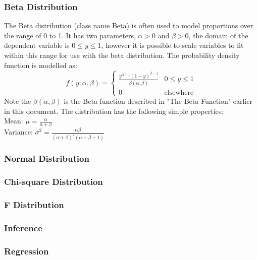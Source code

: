 \documentclass[a4paper]{article}
\begin{document}
\subsubsection*{Beta Distribution}
The Beta distribution (class name Beta) is often used to model proportions over the range of 0 to 1. It has two parameters, $\alpha > 0$ and $\beta > 0$, the domain of the dependent variable is $0 \le y \le 1$, however it is possible to scale variables to fit within this range for use with the beta distribution. The probability density function is modelled as:
\[
f(y; \alpha, \beta) = 
	\begin{cases}
		\frac{ y^{\alpha - 1} (1- y)^{\beta - 1} }{ \beta(\alpha, \beta) } & 0 \le y \le 1\\
		0 & \text{elsewhere}
	\end{cases}
\]
Note the $\beta(\alpha, \beta)$ is the Beta function described in "The Beta Function" earlier in this document. The distribution has the following simple properties:\\
Mean: $\mu = \frac{\alpha}{\alpha + \beta}$\\
Variance: $\sigma^2 = \frac{\alpha\beta}{(\alpha + \beta)^2(\alpha + \beta + 1)}$

\subsubsection*{Normal Distribution}

\subsubsection*{Chi-square Distribution}

\subsubsection*{F Distribution}


\subsubsection{Inference}

\subsubsection{Regression}
\end{document}
